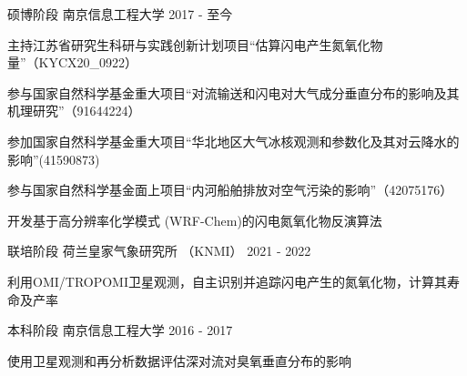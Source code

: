 

\begin{cventries}

  \cventry
    {硕博阶段} %
    {南京信息工程大学} %
    {2017 - 至今} %
    {}%
    {
      \begin{cvitems} %
        \item {主持江苏省研究生科研与实践创新计划项目“估算闪电产生氮氧化物量”（KYCX20\_0922）}
        \item {参与国家自然科学基金重大项目“对流输送和闪电对大气成分垂直分布的影响及其机理研究”（91644224）}
        \item {参加国家自然科学基金重大项目“华北地区大气冰核观测和参数化及其对云降水的影响”(41590873)}
        \item {参与国家自然科学基金面上项目“内河船舶排放对空气污染的影响”（42075176）}
        \item {开发基于高分辨率化学模式 (WRF-Chem)的闪电氮氧化物反演算法}
      \end{cvitems}
    }

  \cventry
    {联培阶段} %
    {荷兰皇家气象研究所 （KNMI）} %
    {2021 - 2022} %
    {}%
    {
      \begin{cvitems} %
        \item {利用OMI/TROPOMI卫星观测，自主识别并追踪闪电产生的氮氧化物，计算其寿命及产率}
      \end{cvitems}
    }

  \cventry
    {本科阶段} %
    {南京信息工程大学} %
    {2016 - 2017} %
    {}%
    {
      \begin{cvitems} %
        \item {使用卫星观测和再分析数据评估深对流对臭氧垂直分布的影响}
      \end{cvitems}
    }


\end{cventries}
